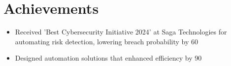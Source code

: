 \documentclass[10pt]{article}
\begin{document}
\section*{Achievements}
\vspace{0.05cm}
\begin{itemize}[leftmargin=0.5cm, itemsep=2pt]

  \item Received 'Best Cybersecurity Initiative 2024' at Saga Technologies for automating risk detection, lowering breach probability by 60%

  \item Designed automation solutions that enhanced efficiency by 90%

\end{itemize}
\end{document}
